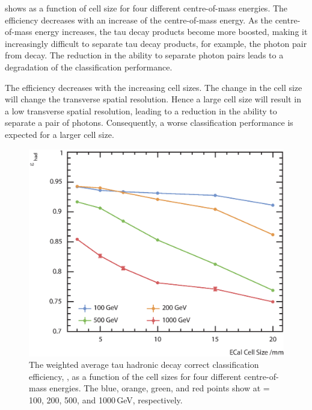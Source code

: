  shows \tauHad as a function of \ECAL cell size for four different centre-of-mass energies. The efficiency \tauHad decreases with an increase of the centre-of-mass energy. As the centre-of-mass energy increases, the tau decay products become more boosted, making it increasingly difficult to separate tau decay products, for example, the photon pair from \Ppizero decay. The reduction in the ability to separate photon pairs leads to a degradation of  the classification performance.

 The efficiency \tauHad decreases with the  increasing \ECAL cell sizes. The change in the \ECAL cell size will change the \ECAL transverse spatial resolution. Hence a large cell size will result in a low transverse spatial resolution, leading to a reduction in the ability to separate a pair of photons. Consequently, a worse classification performance is expected for a larger \ECAL cell size.


\begin{figure}[htbp]
\centering %
\includegraphics[width=.85\textwidth]{tau/plots3/hadronicEff2}
\caption[The tau hadronic decay efficiency as a function of  the \ECAL cell sizes at different \sqrtS with the \ILD detector model.]
{The weighted average tau hadronic decay correct classification efficiency, \tauHad, as a function of  the \ECAL cell sizes for four different centre-of-mass energies. The blue, orange, green, and red points  show \tauHad at \sqrtS = 100, 200, 500, and 1000\,GeV, respectively.}
\label{fig:TauHadronicEfficiency}
\end{figure}

